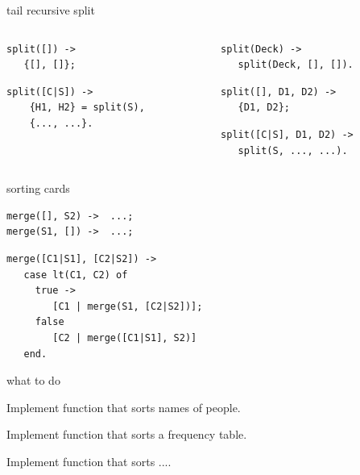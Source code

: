 \begin{frame}[fragile]{tail recursive split}

\begin{columns}

 \begin{column}{0.5\linewidth}
\begin{verbatim}
split([]) ->
   {[], []};
\end{verbatim}
\pause
\begin{verbatim}
split([C|S]) ->
    {H1, H2} = split(S),
    {..., ...}.
\end{verbatim}
 \end{column}
 
 \pause

 \begin{column}{0.5\linewidth}
\begin{verbatim}
split(Deck) ->
   split(Deck, [], []).
\end{verbatim}

\pause
\begin{verbatim}
split([], D1, D2) ->
   {D1, D2};
\end{verbatim}
\pause
\begin{verbatim}
split([C|S], D1, D2) ->
   split(S, ..., ...).
\end{verbatim}
 \end{column}
\end{columns}

\end{frame}

\begin{frame}[fragile]{sorting cards}

\begin{verbatim}
merge([], S2) ->  ...;
merge(S1, []) ->  ...;
\end{verbatim}
\pause
\begin{verbatim}
merge([C1|S1], [C2|S2]) -> 
   case lt(C1, C2) of
     true -> 
        [C1 | merge(S1, [C2|S2])];
     false
        [C2 | merge([C1|S1], S2)]
   end.
\end{verbatim}

\end{frame}

\begin{frame}{what to do}

\pause Implement function that sorts names of people.

\pause Implement function that sorts a frequency table.

\pause Implement function that sorts ....


\end{frame}

